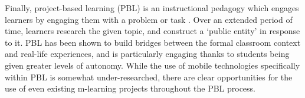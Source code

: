 Finally, project-based learning (PBL) is an instructional pedagogy which engages learners by engaging them with a problem or task \citep{Blumenfeld1991}. Over an extended period of time, learners research the given topic, and construct a `public entity' in response to it. PBL has been shown to build bridges between the formal classroom context and real-life experiences, and is particularly engaging thanks to students being given greater levels of autonomy. While the use of mobile technologies specifically within PBL is somewhat under-researched, there are clear opportunities for the use of even existing m-learning projects throughout the PBL process.